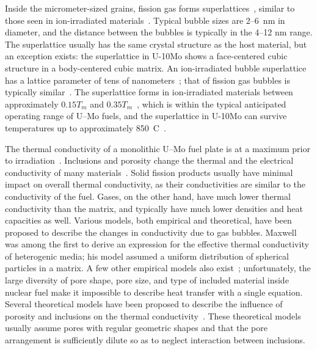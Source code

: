 Inside the micrometer-sized grains, fission gas forms superlattices~\cite{miller2015transmission,miller2012advantages, gan2012tem},
similar to those seen in ion-irradiated materials~\cite{johnson1980gas, johnson1980hydrogen, evans1983void, mazey1986bubble, evans1986solid, johnson1991image, johnson1995gas, lawson1998temperature, ghoniem2001theory,johnson2006helium}. Typical bubble sizes are 2--6~nm in diameter, and the distance between the bubbles is typically in the 4--12 nm range. The superlattice usually has the same crystal structure as the host material, but an exception exists: the superlattice in U-10Mo shows a face-centered cubic structure in a body-centered cubic matrix. An ion-irradiated bubble superlattice has a lattice parameter of tens of nanometers~\cite{miller2015transmission}; that of fission gas bubbles is
typically similar~\cite{Gan2015}.
The superlattice forms in ion-irradiated materials between approximately
$0.15T_m$ and $0.35T_m$~\cite{lawson1998temperature}, which is within the
typical anticipated operating range of \mbox{U--Mo} fuels, and the superlattice
in \mbox{U-10Mo} can survive temperatures up to approximately
850~\textdegree C~\cite{Gan2015}.

The thermal conductivity of a monolithic \mbox{U--Mo} fuel plate is at a maximum prior to irradiation~\cite{burkes2015thermal}.
Inclusions and porosity change the thermal and the electrical conductivity of many materials~\cite{bakker1997using}. 
Solid fission products usually have minimal impact on overall thermal conductivity, as their conductivities are similar to the conductivity of the fuel. Gases, on the other hand, have much lower thermal conductivity than
the matrix, and typically have much lower densities and heat capacities as well. Various models, both empirical and theoretical, have been proposed to describe the changes in conductivity due to gas bubbles. Maxwell~\cite{maxwell1881treatise} was among the first to derive an expression for the effective thermal conductivity of heterogenic media; his model assumed a uniform distribution of spherical particles in a matrix. A few other empirical models also exist~\cite{macewan1967effect,goldsmith1973measurements,devries1989experimental}; unfortunately, the large diversity of pore shape, pore size, and type of included material inside nuclear fuel make it impossible to describe heat transfer with a single equation. Several theoretical models have been proposed to describe the influence of porosity and inclusions on the thermal conductivity~\cite{maxwell1881treatise,loeb1954thermal, cunningham1981heat, tzou1991effect, bauer1993general}. These theoretical models usually assume pores with regular geometric shapes and that the pore arrangement is sufficiently dilute so as to neglect interaction between inclusions.

